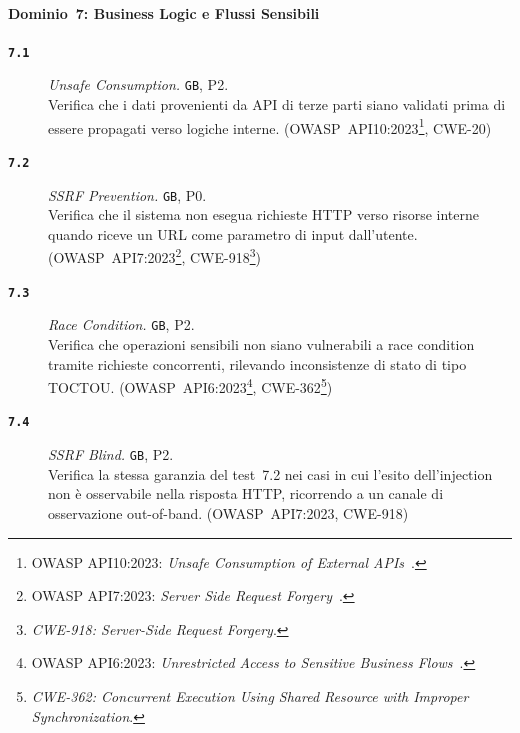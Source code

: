 \paragraph{Dominio~7: Business Logic e Flussi Sensibili}
\begin{description}
      \item[\textbf{\texttt{7.1}}]
            \textit{Unsafe Consumption.} \texttt{GB}, P2.\\
            Verifica che i dati provenienti da \gls{API} di terze parti siano validati prima di essere propagati verso logiche interne.
            (\gls{OWASP}~API10:2023\footnote{\gls{OWASP} API10:2023: \textit{Unsafe Consumption of External APIs}~\cite{OWASPTop10}.}, \gls{CWE}-20)

      \item[\textbf{\texttt{7.2}}]
            \textit{\gls{SSRF} Prevention.} \texttt{GB}, P0.\\
            Verifica che il sistema non esegua richieste \gls{HTTP} verso risorse interne quando riceve un \gls{URL} come parametro di input dall'utente.
            (\gls{OWASP}~API7:2023\footnote{\gls{OWASP} API7:2023: \textit{Server Side Request Forgery}~\cite{OWASPTop10}.}, \gls{CWE}-918\footnote{\textit{CWE-918: Server-Side Request Forgery}.})

      \item[\textbf{\texttt{7.3}}]
            \textit{Race Condition.} \texttt{GB}, P2.\\
            Verifica che operazioni sensibili non siano vulnerabili a race condition tramite richieste concorrenti, rilevando inconsistenze di stato di tipo \gls{TOCTOU}.
            (\gls{OWASP}~API6:2023\footnote{\gls{OWASP} API6:2023: \textit{Unrestricted Access to Sensitive Business Flows}~\cite{OWASPTop10}.}, \gls{CWE}-362\footnote{\textit{CWE-362: Concurrent Execution Using Shared Resource with Improper Synchronization}.})

      \item[\textbf{\texttt{7.4}}]
            \textit{\gls{SSRF} Blind.} \texttt{GB}, P2.\\
            Verifica la stessa garanzia del test~7.2 nei casi in cui l'esito dell'injection non è osservabile nella risposta \gls{HTTP}, ricorrendo a un canale di osservazione out-of-band.
            (\gls{OWASP}~API7:2023, \gls{CWE}-918)
\end{description}
